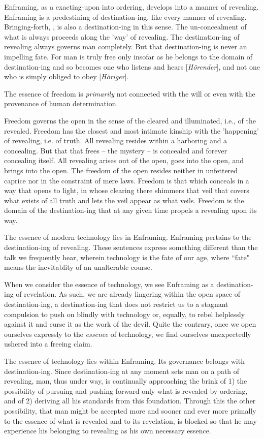 \documentclass[12pt]{article}
\begin{document}
Enframing, as a exacting-upon into ordering, develops into a manner of revealing. Enframing is a predestining of destination-ing, like every manner of revealing. Bringing-forth, , is also a destination-ing in this sense. The un-concealment of what is always proceeds along the 'way' of revealing. The destination-ing of revealing always governs man completely. But that destination-ing is never an impelling fate. For man is truly free only insofar as he belongs to the domain of destination-ing and so becomes one who listens and hears [\textit{H\"{o}render}], and not one who is simply obliged to obey [\textit{H\"{o}riger}].

The essence of freedom is \textit{primarily} not connected with the will or even with the provenance of human determination.

Freedom governs the open in the sense of the cleared and illuminated, i.e., of the revealed. Freedom has the closest and most intimate kinship with the 'happening' of revealing, i.e. of truth. All revealing resides within a harboring and a concealing. But that that frees -- the mystery -- is concealed and forever concealing itself. All revealing arises out of the open, goes into the open, and brings into the open. The freedom of the open resides neither in unfettered caprice nor in the constraint of mere laws. Freedom is that which conceals in a way that opens to light, in whose clearing there shimmers that veil that covers what exists of all truth and lets the veil appear as what veils. Freedom is the domain of the destination-ing that at any given time propels a revealing upon its way.

The essence of modern technology lies in Enframing. Enframing pertains to the destination-ing of revealing. These sentences express something different than the talk we frequently hear, wherein technology is the fate of our age, where ``fate" means the inevitablity of an unalterable course.

When we consider the essence of technology, we see Enframing as a destination-ing of revelation. As such, we are already lingering within the open space of destination-ing, a destination-ing that does not restrict us to a stagnant compulsion to push on blindly with technology or, equally, to rebel helplessly against it and curse it as the work of the devil. Quite the contrary, once we open ourselves expressly to the \textit{essence} of technology, we find ourselves unexpectedly ushered into a freeing claim.

The essence of technology lies within Enframing. Its governance belongs with destination-ing. Since destination-ing at any moment sets man on a path of revealing, man, thus under way, is continually approaching the brink of 1) the possibility of pursuing and pushing forward only what is revealed by ordering, and of 2) deriving all his standards from this foundation. Through this the other possibility, that man might be accepted more and sooner and ever more primally to the essence of what is revealed and to its revelation, is blocked so that he may experience his belonging to revealing as his own necessary essence.
\end{document}
